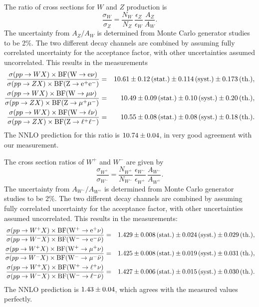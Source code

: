 \par
The ratio of cross sections for $W$ and $Z$ production is
\begin{displaymath}
  \frac{\sigma_W}{\sigma_Z} =
  \frac{N_W}{N_Z} \,
  \frac{\epsilon_Z}{\epsilon_W} \,
  \frac{A_Z}{A_W} .
\end{displaymath}
The uncertainty from $A_Z/A_W$ is determined from Monte Carlo 
generator studies to be 2\%.  The two different decay channels 
are combined by assuming fully correlated uncertainty for the 
acceptance factor, with other uncertainties assumed uncorrelated.  
This results in the measurements
\begin{eqnarray*}
  \RESRATWZE , \\
  \RESRATWZM , \\
  \RESRATWZL . \\
\end{eqnarray*}
The NNLO prediction for this ratio is $\THEORYRATIOWZ$, 
in very good agreement with our measurement.

The cross section ratios of $W^+$ and $W^-$ are given by
\begin{displaymath}
  \frac{\sigma_{W^+}}{\sigma_{W^-}} =
  \frac{N_{W^+}}{N_{W^-}} \,
  \frac{\epsilon_{W^-}}{\epsilon_{W^+}} \,
  \frac{A_{W^-}}{A_{W^+}} .
\end{displaymath}
The uncertainty from ${A_{W^-}}/{A_{W^+}}$ is determined from Monte Carlo
generator studies to be 2\%.  The two different decay channels are
combined by assuming fully correlated uncertainty for the acceptance
factor, with other uncertainties assumed uncorrelated.  This results
in the measurements:
\begin{eqnarray*}
  \RESRATWWE , \\
  \RESRATWWM , \\
  \RESRATWWL . \\
\end{eqnarray*}
The NNLO prediction is $\THEORYRATIOWW$, which agrees
with the measured values perfectly.




